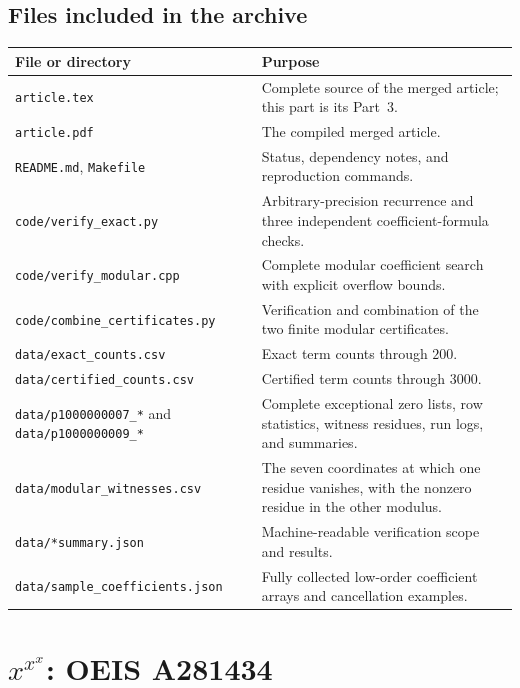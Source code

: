 \documentclass[11pt,a4paper]{article}
\numberwithin{equation}{section}
\theoremstyle{definition}
\theoremstyle{remark}
\theoremstyle{plain}
\begin{document}
\subsection{Files included in the archive}
\begin{longtable}{@{}>{\raggedright\arraybackslash}p{}>{\raggedright\arraybackslash}p{}@{}}
\toprule
File or directory & Purpose\\
\midrule
\endhead
\texttt{article.tex} & Complete source of the merged article; this part is its Part~3.\\
\texttt{article.pdf} & The compiled merged article.\\
\texttt{README.md}, \texttt{Makefile} & Status, dependency notes, and reproduction commands.\\
\texttt{code/verify\_exact.py} & Arbitrary-precision recurrence and three independent coefficient-formula checks.\\
\texttt{code/verify\_modular.cpp} & Complete modular coefficient search with explicit overflow bounds.\\
\texttt{code/combine\_certificates.py} & Verification and combination of the two finite modular certificates.\\
\texttt{data/exact\_counts.csv} & Exact term counts through $200$.\\
\texttt{data/certified\_counts.csv} & Certified term counts through $3000$.\\
\texttt{data/p1000000007\_*} and \texttt{data/p1000000009\_*} & Complete exceptional zero lists, row statistics, witness residues, run logs, and summaries.\\
\texttt{data/modular\_witnesses.csv} & The seven coordinates at which one residue vanishes, with the nonzero residue in the other modulus.\\
\texttt{data/*summary.json} & Machine-readable verification scope and results.\\
\texttt{data/sample\_coefficients.json} & Fully collected low-order coefficient arrays and cancellation examples.\\
\bottomrule
\end{longtable}

\clearpage
\section{\texorpdfstring{$x^{x^x}$}{x^(x^x)}: OEIS A281434}\label{xxc:part}
\end{document}
